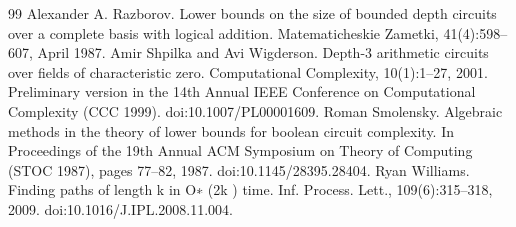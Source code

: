 \documentclass[10pt,a4paper]{article}
\begin{document}
\begin{thebibliography}{99}
 Alexander A. Razborov. Lower bounds on the size of bounded depth circuits over a complete basis with logical addition. Matematicheskie Zametki, 41(4):598–607, April 1987.
 Amir Shpilka and Avi Wigderson. Depth-3 arithmetic circuits over fields of characteristic zero. Computational Complexity, 10(1):1–27, 2001. Preliminary version in the 14th Annual IEEE Conference on Computational Complexity (CCC 1999). doi:10.1007/PL00001609.
 Roman Smolensky. Algebraic methods in the theory of lower bounds for boolean circuit complexity. In Proceedings of the 19th Annual ACM Symposium on Theory of Computing (STOC 1987), pages 77–82, 1987. doi:10.1145/28395.28404.
 Ryan Williams. Finding paths of length k in O∗ (2k ) time. Inf. Process. Lett., 109(6):315–318, 2009. doi:10.1016/J.IPL.2008.11.004.
\end{thebibliography}
\end{document}
